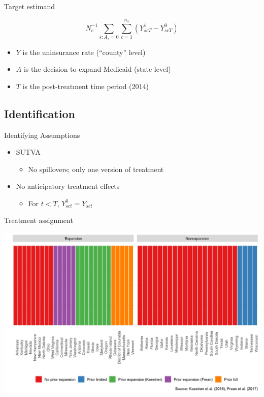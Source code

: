 \documentclass[hyperref={pdfpagelabels=false}]{beamer}
\begin{document}
\begin{frame}{Target estimand}

$$
N_c^{-1}\sum_{s: A_s = 0} \sum_{c = 1}^{n_s} (Y_{scT}^1 - Y_{scT}^0)
$$

\begin{itemize}
    \item $Y$ is the uninsurance rate (``county'' level) \bigskip
    \item $A$ is the decision to expand Medicaid (state level) \bigskip
    \item $T$ is the post-treatment time period (2014)
\end{itemize}
\end{frame}

\subsection{Identification}

\begin{frame}{Identifying Assumptions}

\begin{itemize}
    \item SUTVA \bigskip
    \begin{itemize}
        \item No spillovers; only one version of treatment \bigskip
    \end{itemize}
    \item No anticipatory treatment effects \bigskip
    \begin{itemize}
        \item For $t < T$, $Y_{sct}^0 = Y_{sct}$ \bigskip
    \end{itemize}
\end{itemize}

\end{frame}

\begin{frame}{Treatment assignment}
    \begin{center}
	\includegraphics[scale=0.5]{01_Plots/expansion-heterogeneity.png}
    \end{center}
\end{frame}
\end{document}
